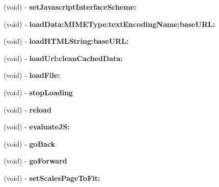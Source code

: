 \begin{DoxyCompactItemize}
(void) -\/ {\bfseries set\+Javascript\+Interface\+Scheme\+:}
\item 
\mbox{\label{interfaceUIWebViewWrapper_a6bcec909f966ca92aa2f33eb2467193c}} 
(void) -\/ {\bfseries load\+Data\+:\+M\+I\+M\+E\+Type\+:text\+Encoding\+Name\+:base\+U\+R\+L\+:}
\item 
\mbox{\label{interfaceUIWebViewWrapper_ab48fb83ff857f4c6bccfb85d7fc1833e}} 
(void) -\/ {\bfseries load\+H\+T\+M\+L\+String\+:base\+U\+R\+L\+:}
\item 
\mbox{\label{interfaceUIWebViewWrapper_ae1c17cc944056377389b2ac46b61ec04}} 
(void) -\/ {\bfseries load\+Url\+:clean\+Cached\+Data\+:}
\item 
\mbox{\label{interfaceUIWebViewWrapper_a27487c8490b0d9c5756f1c3dad00b4bc}} 
(void) -\/ {\bfseries load\+File\+:}
\item 
\mbox{\label{interfaceUIWebViewWrapper_a4808dcb635b40258cec866aa5589fa8b}} 
(void) -\/ {\bfseries stop\+Loading}
\item 
\mbox{\label{interfaceUIWebViewWrapper_a8d2f4112cbcbb2f5b6c3708cd644af3e}} 
(void) -\/ {\bfseries reload}
\item 
\mbox{\label{interfaceUIWebViewWrapper_ab7bc3f1a5eb75f56d7d10bca13975f45}} 
(void) -\/ {\bfseries evaluate\+J\+S\+:}
\item 
\mbox{\label{interfaceUIWebViewWrapper_a5abc1d189445194caeb5be5e5dccd1d8}} 
(void) -\/ {\bfseries go\+Back}
\item 
\mbox{\label{interfaceUIWebViewWrapper_a1073ea594792abc45e9fb0ac75d8627b}} 
(void) -\/ {\bfseries go\+Forward}
\item 
\mbox{\label{interfaceUIWebViewWrapper_af2033de229c4895f8c6f97d098d7d1e7}} 
(void) -\/ {\bfseries set\+Scales\+Page\+To\+Fit\+:}
\end{DoxyCompactItemize}
